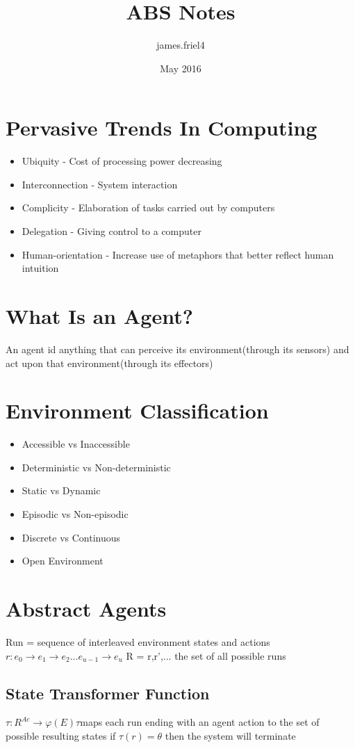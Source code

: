 \documentclass{article}
\title{ABS Notes}
\author{james.friel4 }
\date{May 2016}
\begin{document}
\maketitle

\section{Pervasive Trends In Computing}
\begin{itemize}
    \item Ubiquity - Cost of processing power decreasing
    \item Interconnection - System interaction
    \item Complicity - Elaboration of tasks carried out by computers
    \item Delegation - Giving control to a computer
    \item Human-orientation - Increase use of metaphors that better reflect human intuition
\end{itemize}

\section{What Is an Agent?}
An agent id anything that can perceive its environment(through its sensors) and act upon that environment(through its effectors)

\section{Environment Classification}
\begin{itemize}
    \item Accessible vs Inaccessible
    \item Deterministic vs Non-deterministic
    \item Static vs Dynamic
    \item Episodic vs Non-episodic
    \item Discrete vs Continuous
    \item Open Environment
\end{itemize}

\section{Abstract Agents}
Run = sequence of interleaved environment states and actions
$ r: e_0 \rightarrow e_1 \rightarrow e_2 ... e_{u-1}\rightarrow e_u$
R = {r,r',...} the set of all possible runs
\subsection{State Transformer Function}
$\tau: R^{Ac} \rightarrow \varphi(E)
\tau $maps each run ending with an agent action to the set of possible resulting states
if $\tau(r) = \theta$ then the system will terminate
\end{document}
